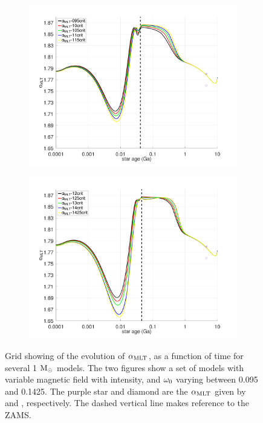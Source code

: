 \documentclass[fleqn,usenatbib]{mnras}
\begin{document}
\begin{figure}
    \centering
    \begin{subfigure}[h]{0.47\textwidth}
    \includegraphics[clip,width=\textwidth]{figures/paper2/alpha_mlt_var_vel_g1.pdf}
    \label{fig:subim41}
    \end{subfigure}
    \begin{subfigure}[h]{0.47\textwidth}
    \includegraphics[clip,width=\textwidth]{figures/paper2/alpha_mlt_var_vel_g3.pdf}
    \label{fig:subim42}
    \end{subfigure}
\caption{Grid showing of the evolution of $\alpha_{\mathrm{MLT}}$, as a function of time for several 1 $\mathrm{M}_\odot$ models. The two figures show a set of models with variable magnetic field with intensity, and $\omega_{\mathrm{0}}$ varying between 0.095 and 0.1425. The purple star and diamond are the $\alpha_{\mathrm{MLT}}$ given by \citet{Sonoi2018} and \citet{Samadi2005}, respectively. The dashed vertical line makes reference to the ZAMS.}
\label{fig:grid_rot_vel}
\end{figure}

\appendix



\bsp	%
\label{lastpage}
\end{document}
